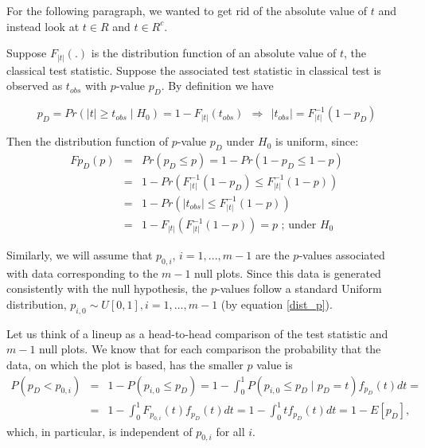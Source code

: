 \documentclass{article}
\newcommand{\blue}[1]{{\color{blue} #1}} %
\newcommand{\red}[1]{{\color{red} #1}} %
\begin{document}
\red{For the following paragraph, we wanted to get rid of the absolute value of $t$ and instead look at $t \in R$ and $t \in R^c$.}

Suppose $F_{|t|}(.)$ is the distribution function of an absolute value of $t$, the classical test statistic. Suppose the associated test statistic in classical test is observed as  $t_{obs}$ with $p$-value $p_D$. By definition we have 

$$p_D=Pr\left(|t| \ge t_{obs} \mid H_0\right)=1-F_{|t|}(t_{obs}) \ \ \Rightarrow \ \  |t_{obs}|=F_{|t|}^{-1}(1-p_D)$$

Then the distribution function of $p$-value $p_D$ under $H_0$ is uniform, since:  
\begin{eqnarray}\label{dist_p}
F{p_D}(p) &=& Pr(p_D \le p)=1-Pr(1-p_D \le 1-p) \nonumber \\
  &=& 1-Pr\left(F_{|t|}^{-1}(1-p_D) \le F_{|t|}^{-1}(1-p) \right) \nonumber \\
  &=& 1-Pr\left(|t_{obs}| \le F_{|t|}^{-1}(1-p)\right) \nonumber \\
  &=&%
          1-F_{|t|}\left( F_{|t|}^{-1}(1-p)\right)=p \mbox{ ; under $H_0$} 
\end{eqnarray}




\blue{Similarly, we will assume that $p_{0,i}$, $i=1, ..., m-1$ are the $p$-values associated with data corresponding to the $m-1$ null plots. Since this data is generated consistently with the null hypothesis,  the $p$-values follow a standard Uniform distribution, $p_{i,0} \sim U[0,1], i= 1, ..., m-1$ (by equation \ref{dist_p}). }

Let us think of a lineup as a head-to-head comparison of the test statistic and $m-1$ null plots. 
We know that for each comparison the probability that the data, on which the plot is based, has the smaller $p$ value is 
\begin{eqnarray*}
P(p_D < p_{0,i}) &=& 1 - P(p_{i,0} \le p_D) = 1- \int_0^1  P(p_{i,0} \le p_D \mid p_D=t) f_{p_D}(t) dt =  \\
&=& 1 - \int_0^1 F_{p_{0,i}}(t) f_{p_D}(t) dt = 1 - \int_0^1 t f_{p_D}(t) dt = 1 - E[p_D],
\end{eqnarray*}
which, in particular, is independent of $p_{0,i}$ for all $i$.
\end{document}
